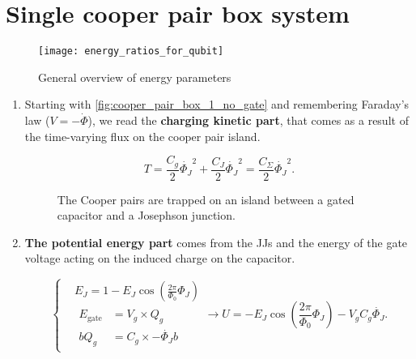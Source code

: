 \section{Single cooper pair box system\label{sec:cooper_pair_box}}
\begin{figure}[h]
  \centering \texttt{[image: energy\_ratios\_for\_qubit]}
  \caption{\small        General        overview        of        energy
    parameters\label{fig:energy_ratios_for_qubit}}
\end{figure}

\begin{enumerate}
\item   Starting    with   \autoref{fig:cooper_pair_box_1_no_gate}   and
  remembering   Faraday's   law   ($V   =  -\dot{\Phi}$),   we   read   the
  \textbf{charging  kinetic  part},  that  comes  as  a  result  of  the
  time-varying flux on the cooper pair island.

  \begin{equation}
    T = \frac{C_g}{2}\dot{\Phi_J}^2 + \frac{C_J}{2}\dot{\Phi_J}^2 = \frac{C_\Sigma}{2}\dot{\Phi_J}^2.
  \end{equation}

  \begin{figure}[h]
    \centering {}
    \caption{\small The Cooper pairs are  trapped on an island between a
      gated          capacitor          and         a          Josephson
      junction.\label{fig:cooper_pair_box_1_no_gate}}
  \end{figure}

\item  \textbf{The potential  energy part}  comes from  the JJs  and the
  energy  of the  gate  voltage  acting on  the  induced  charge on  the
  capacitor.

  \begin{equation}
    \left\{
      \begin{aligned}
        & E_J = 1 - E_J\cos(\frac{2\pi}{\Phi_0}\Phi_J)\\
        & \begin{aligned}  E_\text{gate} & =  V_g \times Q_g\\b Q_g  & =
          C_g\times -\dot{\Phi_J}b
        \end{aligned}
      \end{aligned}\right.  \rightarrow U =
    -E_J\cos(\frac{2\pi}{\Phi_0}\Phi_J)
    -
    V_gC_g\dot{\Phi_J}.
  \end{equation}


\end{enumerate}
